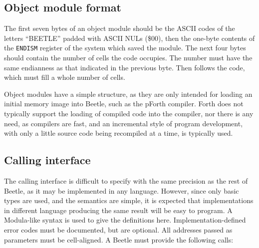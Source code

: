 \documentclass{article}
\begin{document}
\subsection{Object module format}
\label{object}

The first seven bytes of an object module should be the ASCII codes of the letters
``BEETLE'' padded with ASCII NULs (\$00), then the one-byte contents of
the {\tt ENDISM} register of the system which saved the module. The next four
bytes should contain the number of cells the code occupies. The number must have
the same endianness as that indicated in the previous byte. Then follows the
code, which must fill a whole number of cells.

Object modules have a simple structure, as they are only intended for loading an
initial memory image into Beetle, such as the pForth compiler. Forth does not
typically support the loading of compiled code into the compiler, nor there is
any need, as compilers are fast, and an incremental style of program
development, with only a little source code being recompiled at a time, is
typically used.


\subsection{Calling interface}
\label{calls}

The calling interface is difficult to specify with the same precision as the
rest of Beetle, as it may be implemented in any language. However, since only
basic types are used, and the semantics are simple, it is expected that
implementations in different language producing the same result will be easy to
program. A Modula-like syntax is used to give the definitions here.
Implementation-defined error codes must be documented, but are optional. All
addresses passed as parameters must be cell-aligned. A Beetle must provide the
following calls:
\end{document}
